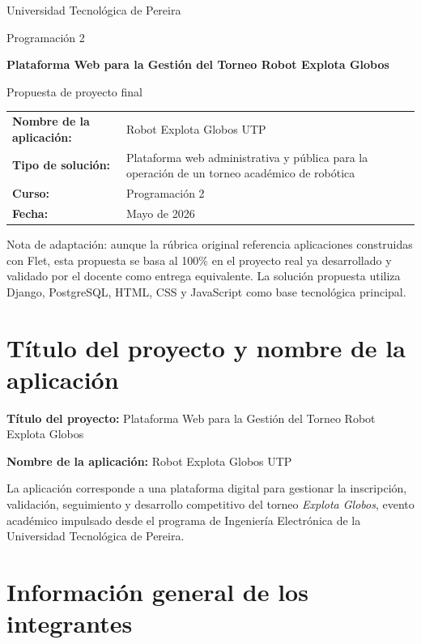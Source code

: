 \documentclass[12pt,a4paper]{article}
\newcommand{\tituloProyecto}{Plataforma Web para la Gestión del Torneo Robot Explota Globos}
\newcommand{\nombreAplicacion}{Robot Explota Globos UTP}
\begin{document}
\begin{titlepage}
    \centering
    {\Large Universidad Tecnológica de Pereira\par}
    \vspace{0.4cm}
    {\large Programación 2\par}
    \vspace{1.8cm}
    {\Huge\bfseries \tituloProyecto \par}
    \vspace{0.7cm}
    {\Large Propuesta de proyecto final\par}
    \vspace{1.5cm}
    \begin{tabular}{>{\bfseries}p{4.8cm}p{9.5cm}}
        Nombre de la aplicación: & \nombreAplicacion \\
        Tipo de solución: & Plataforma web administrativa y pública para la operación de un torneo académico de robótica \\
        Curso: & Programación 2 \\
        Fecha: & Mayo de 2026 \\
    \end{tabular}
    \vfill
    {\small
    Nota de adaptación: aunque la rúbrica original referencia aplicaciones construidas con Flet, esta propuesta se basa al 100\% en el proyecto real ya desarrollado y validado por el docente como entrega equivalente. La solución propuesta utiliza Django, PostgreSQL, HTML, CSS y JavaScript como base tecnológica principal.
    \par}
\end{titlepage}

\section{Título del proyecto y nombre de la aplicación}

\textbf{Título del proyecto:} \tituloProyecto

\textbf{Nombre de la aplicación:} \nombreAplicacion

La aplicación corresponde a una plataforma digital para gestionar la inscripción, validación, seguimiento y desarrollo competitivo del torneo \emph{Explota Globos}, evento académico impulsado desde el programa de Ingeniería Electrónica de la Universidad Tecnológica de Pereira.

\section{Información general de los integrantes}
\end{document}
